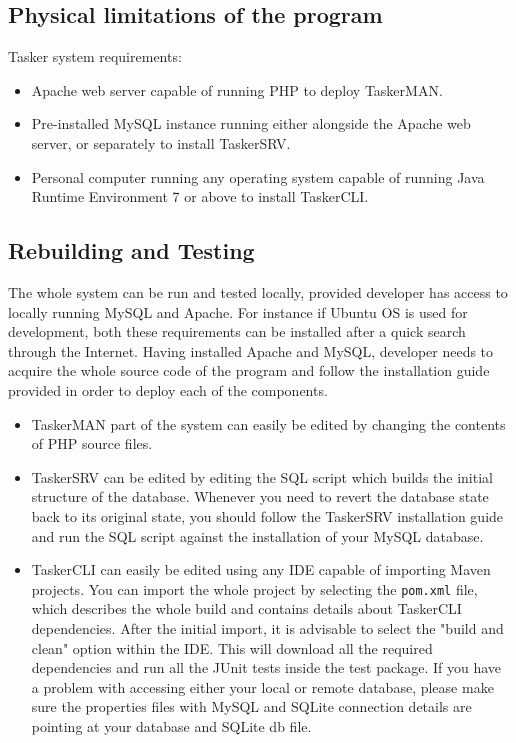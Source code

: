 \documentclass{project}
\begin{document}
\subsection{Physical limitations of the program}
Tasker system requirements:
\begin{itemize}
  \item Apache web server capable of running PHP to deploy TaskerMAN.
  \item Pre-installed MySQL instance running either alongside the Apache web server, or
    separately to install TaskerSRV.
  \item Personal computer running any operating system capable of running Java Runtime
    Environment 7 or above to install TaskerCLI.
\end{itemize}
\subsection{Rebuilding and Testing}
The whole system can be run and tested locally, provided developer has access to 
locally running MySQL and Apache. For instance if Ubuntu OS is used for development,
both these requirements can be installed after a quick search through the Internet.
Having installed Apache and MySQL, developer needs to acquire the whole source code
of the program and follow the installation guide provided in order to deploy each
of the components.
\begin{itemize}
  \item TaskerMAN part of the system can easily be edited by changing the contents of
    PHP source files.
  \item TaskerSRV can be edited by editing the SQL script which builds the initial structure
    of the database. Whenever you need to revert the database state back to its original 
    state, you should follow the TaskerSRV installation guide and run the SQL script
    against the installation of your MySQL database.
  \item TaskerCLI can easily be edited using any IDE capable of importing Maven projects.
    You can import the whole project by selecting the \texttt{pom.xml} file, which 
    describes the whole build and contains details about TaskerCLI dependencies. After the
    initial import, it is advisable to select the "build and clean" option within the IDE.
    This will download all the required dependencies and run all the JUnit tests inside
    the test package. If you have a problem with accessing either your local or remote
    database, please make sure the properties files with MySQL and SQLite connection
    details are pointing at your database and SQLite db file. 
\end{itemize}
\clearpage
\end{document}
